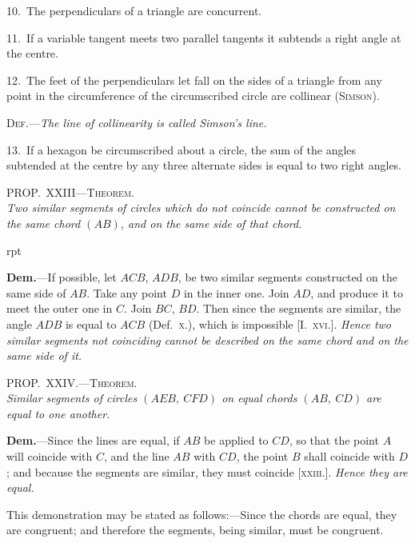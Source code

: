 \documentclass[oneside]{book}
\newcommand\myprop[2]{
\bigskip\Needspace*{4\baselineskip}\begin{center}\textsc{#1}\\\medskip\emph{#2}\par\end{center}
}
\newcommand\imgflow[3]{
\setcounter{wrapwidth}{#1}
\begin{wrapfigure}[#2]{r}{\value{wrapwidth}pt}
\begin{center}
\vspace{-0.3in}
\end{center}
\end{wrapfigure}
}
\newcommand\imgcent[2]{
\begin{center}
\end{center}
}
\begin{document}
\begin{footnotesize}
10.~The perpendiculars of a triangle are concurrent.

11.~If a variable tangent meets two parallel tangents it subtends
a right angle at the centre.

12.~The feet of the perpendiculars let fall on the sides of a
triangle from any point in the circumference of the circumscribed
circle are collinear (\textsc{Simson}).

\textsc{Def.}---\emph{The line of collinearity is called Simson's line.}

13.~If a hexagon be circumscribed about a circle, the sum of
the angles subtended at the centre by any three alternate sides is
equal to two right angles.
\par\end{footnotesize}

\myprop{PROP\@.~XXIII---Theorem.}{Two similar segments of circles which do not coincide
cannot be constructed on the same chord $(AB)$, and on the
same side of that chord.}

\imgflow{145}{5}{f130}

\textbf{Dem.}---If possible, let $ACB$, $ADB$, be two similar
segments constructed on the same side of $AB$. Take
any point $D$ in the inner one. Join $AD$, and produce
it to meet the outer one in $C$.
Join $BC$, $BD$. Then since
the segments are similar,
the angle $ADB$ is equal to
$ACB$ (Def.~\textsc{x.}), which is impossible
[I.~\textsc{xvi.}]. \emph{Hence two similar segments not coinciding
cannot be described on the same chord and on the
same side of it.}

\myprop{PROP\@.~XXIV\@.---Theorem.}{Similar segments of circles $(AEB,\ CFD)$ on equal chords
$(AB,\ CD)$ are equal to one another.}

\imgcent{300}{f131}

\textbf{Dem.}---Since the lines are equal, if $AB$ be applied
to $CD$, so that the point $A$ will coincide with $C$, and
the line $AB$ with $CD$, the point $B$ shall coincide with
$D$; and because the segments are similar, they must
coincide [\textsc{xxiii.}]. \emph{Hence they are equal.}\par\medskip

\begin{footnotesize}
This demonstration may be stated as follows:---Since the chords
are equal, they are congruent; and therefore the segments, being
similar, must be congruent.
\par\end{footnotesize}
\end{document}
